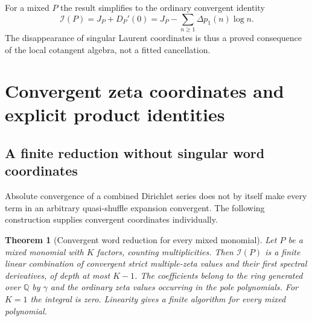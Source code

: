 \documentclass[11pt,a4paper]{article}
\numberwithin{equation}{section}
\newtheorem{theorem}{Theorem}[section]
\theoremstyle{definition}
\theoremstyle{remark}
\newcommand{\Q}{\mathbb Q}
\newcommand{\cI}{\mathcal I}
\begin{document}
For a mixed $P$ the result simplifies to the ordinary convergent identity
\begin{equation}\label{poly:mixed}
 \boxed{\cI(P)=J_P+D_P'(0)
       =J_P-\sum_{n\ge1}\Delta p_1(n)\log n.}
\end{equation}
The disappearance of singular Laurent coordinates is thus a proved
consequence of the local cotangent algebra, not a fitted cancellation.



\section{Convergent zeta coordinates and explicit product identities}
\label{poly:coordinates}

\subsection{A finite reduction without singular word coordinates}

Absolute convergence of a combined Dirichlet series does not by itself
make every term in an arbitrary quasi-shuffle expansion convergent.
The following construction supplies convergent coordinates individually.

\begin{theorem}[Convergent word reduction for every mixed monomial]
\label{poly:words}
Let $P$ be a mixed monomial with $K$ factors, counting multiplicities.
Then $\cI(P)$ is a finite linear combination of convergent strict
multiple-zeta values and their first spectral derivatives, of depth at
most $K-1$. The coefficients belong to the ring generated over $\Q$
by $\gamma$ and the ordinary zeta values occurring in the pole
polynomials. For $K=1$ the integral is zero. Linearity gives a finite
algorithm for every mixed polynomial.
\end{theorem}
\end{document}
